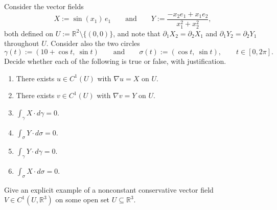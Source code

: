 \begin{exercise}
\label{ex:two_fields_two_circles}
Consider the vector fields
\[X := \sin(x_1)\,e_1 \qquad\text{and}\qquad Y := \frac{-x_2 e_1 + x_1 e_2}{x_1^2+x_2^2},\]
both defined on $U := \mathbb{R}^2\setminus\{(0,0)\}$, and note that $\partial_1X_2 =
\partial_2X_1$ and $\partial_1Y_2 = \partial_2Y_1$ throughout $U$. Consider also the two circles
\[\gamma(t) := (10+\cos t,\ \sin t) \qquad\text{and}\qquad \sigma(t) := (\cos t,\ \sin t),
  \qquad t \in [0,2\pi].\]
Decide whether each of the following is true or false, with justification.
\begin{enumerate}[label=\textbf{(\alph*)}]
  \item There exists $u \in C^1(U)$ with $\nabla u = X$ on $U$.
  \item There exists $v \in C^1(U)$ with $\nabla v = Y$ on $U$.
  \item $\int_\gamma X \cdot d\gamma = 0$.
  \item $\int_\sigma Y \cdot d\sigma = 0$.
  \item $\int_\gamma Y \cdot d\gamma = 0$.
  \item $\int_\sigma X \cdot d\sigma = 0$.
\end{enumerate}
\end{exercise}

\begin{exercise}
\label{ex:box_nonconstant_conservative_field}
Give an explicit example of a nonconstant conservative vector field $V \in C^1(U,\mathbb{R}^3)$ on
some open set $U \subseteq \mathbb{R}^3$.
\end{exercise}


